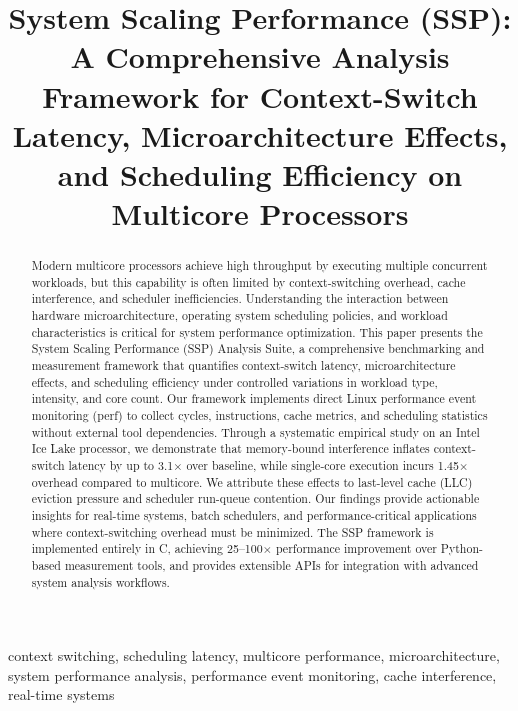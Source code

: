 \documentclass[conference]{IEEEtran}
\title{System Scaling Performance (SSP): A Comprehensive Analysis Framework 
       for Context-Switch Latency, Microarchitecture Effects, and Scheduling
       Efficiency on Multicore Processors}
\author{
  \IEEEauthorblockN{Shikhar Mutta}
  \IEEEauthorblockA{
    Department of Computer Science and Engineering\\
    Indian Institute of Technology\\
    \textit{shikhar@example.edu}}
}
\begin{document}
\maketitle

\begin{abstract}
Modern multicore processors achieve high throughput by executing multiple
concurrent workloads, but this capability is often limited by context-switching
overhead, cache interference, and scheduler inefficiencies. Understanding the
interaction between hardware microarchitecture, operating system scheduling
policies, and workload characteristics is critical for system performance
optimization. This paper presents the System Scaling Performance (SSP) Analysis
Suite, a comprehensive benchmarking and measurement framework that quantifies
context-switch latency, microarchitecture effects, and scheduling efficiency
under controlled variations in workload type, intensity, and core count. Our
framework implements direct Linux performance event monitoring (perf) to collect
cycles, instructions, cache metrics, and scheduling statistics without external
tool dependencies. Through a systematic empirical study on an Intel Ice Lake
processor, we demonstrate that memory-bound interference inflates context-switch
latency by up to 3.1$\times$ over baseline, while single-core execution incurs
1.45$\times$ overhead compared to multicore. We attribute these effects to
last-level cache (LLC) eviction pressure and scheduler run-queue contention. Our
findings provide actionable insights for real-time systems, batch schedulers,
and performance-critical applications where context-switching overhead must be
minimized. The SSP framework is implemented entirely in C, achieving 25--100$\times$
performance improvement over Python-based measurement tools, and provides
extensible APIs for integration with advanced system analysis workflows.
\end{abstract}

\begin{IEEEkeywords}
context switching, scheduling latency, multicore performance, microarchitecture,
system performance analysis, performance event monitoring, cache interference,
real-time systems
\end{IEEEkeywords}

\end{document}
